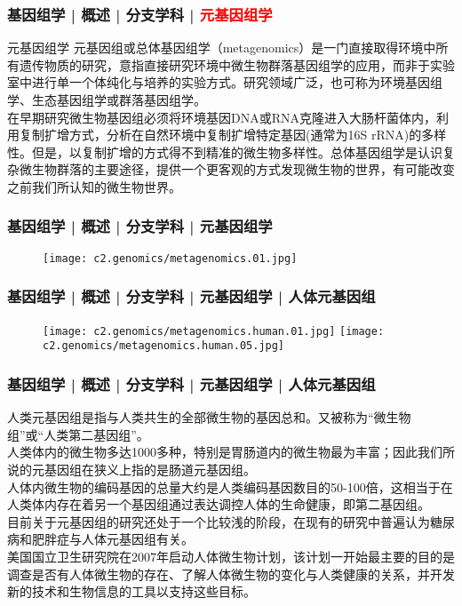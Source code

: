 \begin{frame}
  \frametitle{基因组学 | 概述 | 分支学科 | \textcolor{red}{元基因组学}}
  \begin{block}{元基因组学}
元基因组或总体基因组学（metagenomics）是一门直接取得环境中所有遗传物质的研究，意指直接研究环境中微生物群落基因组学的应用，而非于实验室中进行单一个体纯化与培养的实验方式。研究领域广泛，也可称为环境基因组学、生态基因组学或群落基因组学。\\
\vspace{1em}
在早期研究微生物基因组必须将环境基因DNA或RNA克隆进入大肠杆菌体内，利用复制扩增方式，分析在自然环境中复制扩增特定基因(通常为16S rRNA)的多样性。但是，以复制扩增的方式得不到精准的微生物多样性。总体基因组学是认识复杂微生物群落的主要途径，提供一个更客观的方式发现微生物的世界，有可能改变之前我们所认知的微生物世界。
  \end{block}
\end{frame}

\begin{frame}
  \frametitle{基因组学 | 概述 | 分支学科 | 元基因组学}
  \begin{figure}
    \centering
    \texttt{[image: c2.genomics/metagenomics.01.jpg]}
  \end{figure}
\end{frame}

\begin{frame}
  \frametitle{基因组学 | 概述 | 分支学科 | 元基因组学 | 人体元基因组}
  \begin{figure}
    \centering
    \texttt{[image: c2.genomics/metagenomics.human.01.jpg]}
    \quad
    \texttt{[image: c2.genomics/metagenomics.human.05.jpg]}
  \end{figure}
\end{frame}

\begin{frame}
  \frametitle{基因组学 | 概述 | 分支学科 | 元基因组学 | 人体元基因组}
人类元基因组是指与人类共生的全部微生物的基因总和。又被称为“微生物组”或“人类第二基因组”。\\
\vspace{1em}
人类体内的微生物多达1000多种，特别是胃肠道内的微生物最为丰富；因此我们所说的元基因组在狭义上指的是肠道元基因组。\\
\vspace{1em}
人体内微生物的编码基因的总量大约是人类编码基因数目的50-100倍，这相当于在人类体内存在着另一个基因组通过表达调控人体的生命健康，即第二基因组。\\
\vspace{1em}
目前关于元基因组的研究还处于一个比较浅的阶段，在现有的研究中普遍认为糖尿病和肥胖症与人体元基因组有关。\\
\vspace{1em}
美国国立卫生研究院在2007年启动人体微生物计划，该计划一开始最主要的目的是调查是否有人体微生物的存在、了解人体微生物的变化与人类健康的关系，并开发新的技术和生物信息的工具以支持这些目标。
\end{frame}

